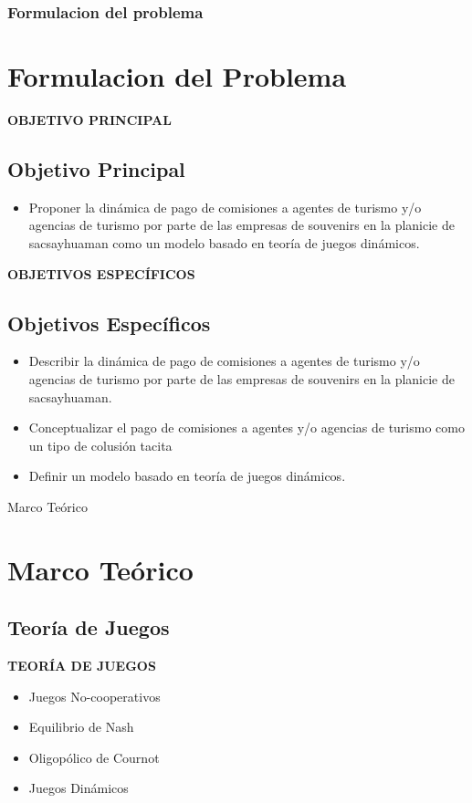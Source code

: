 \documentclass[11pt]{beamer}
\begin{document}
	\begin{frame}
	\frametitle{Formulacion del problema}
	\section{Formulacion del Problema}
		
		\textbf{OBJETIVO PRINCIPAL}
		\subsection{Objetivo Principal}
		\begin{itemize}
			\item Proponer la dinámica de pago de comisiones a agentes de turismo y/o agencias de turismo por parte de las empresas de souvenirs   en la planicie de sacsayhuaman como un modelo basado en teoría de juegos dinámicos.
		\end{itemize}
		
		\textbf{OBJETIVOS ESPECÍFICOS}
		\subsection{Objetivos Específicos}
		\begin{itemize}
			\item Describir la dinámica de pago de comisiones a agentes de turismo y/o agencias de turismo por parte de las empresas de souvenirs   en la planicie de sacsayhuaman. 
			\item Conceptualizar el pago de comisiones a agentes y/o agencias de turismo como un tipo de colusión tacita
			\item Definir un modelo basado en teoría de juegos dinámicos.
		\end{itemize}
		
	\end{frame}
	\begin{frame}{Marco Teórico}
	\section{Marco Teórico}
	
	\subsection{Teoría de Juegos}
	\textbf{TEORÍA DE JUEGOS}
	\begin{itemize}
		\item Juegos No-cooperativos
		\item Equilibrio de Nash
		\item Oligopólico de Cournot
		\item Juegos Dinámicos
	\end{itemize}
	
	
	
	\end{frame}
\end{document}
